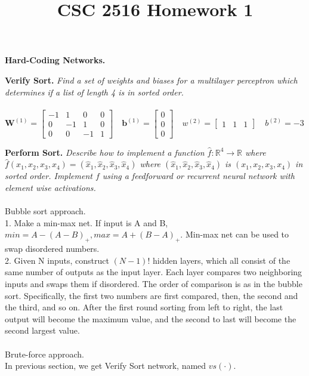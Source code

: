\documentclass{myhw}
\title{CSC 2516 Homework 1}
\begin{document}
\begin{homeworkProblem}
\textbf{Hard-Coding Networks.}
\begin{homeworkSection}
\textbf{Verify Sort.} 
\emph{Find a set of weights and biases for a multilayer perceptron which determines if a list of length 4 is in sorted order.} \\
\\
$\textbf{W}^{(1)} = \begin{bmatrix}
-1 & 1 & 0 & 0\\
0 & -1 & 1 & 0\\
0 & 0 & -1 & 1
\end{bmatrix} \quad 
\textbf{b}^{(1)} = \begin{bmatrix} 0 \\ 0 \\ 0 \end{bmatrix} \quad 
w^{(2)} = \begin{bmatrix} 1 & 1 & 1 \end{bmatrix} \quad b^{(2)} = -3$
\end{homeworkSection}
\begin{homeworkSection}
\textbf{Perform Sort.}
\emph{Describe how to implement a function $\hat{f} : \mathbb{R}^4 \rightarrow \mathbb{R}$ where $\hat{f} (x_1, x_2, x_3, x_4) = (\hat{x}_1, \hat{x}_2, \hat{x}_3, \hat{x}_4)$ where $(\hat{x}_1, \hat{x}_2, \hat{x}_3, \hat{x}_4)$ is $(x_1, x_2, x_3, x_4)$ in sorted order. Implement $f$ using a feedforward or recurrent neural network with element wise activations.} \\
\\
Bubble sort approach. \\
1. Make a min-max net. If input is A and B, $min = A - (A-B)_+, max = A + (B-A)_+$. Min-max net can be used to swap disordered numbers. \\
2. Given N inputs, construct $(N-1)!$ hidden layers, which all consist of the same number of outputs as the input layer. Each layer compares two neighboring inputs and swaps them if disordered. The order of comparison is as in the bubble sort. Specifically, the first two numbers are first compared, then, the second and the third, and so on. After the first round sorting from left to right, the last output will become the maximum value, and the second to last will become the second largest value. 
\\
\\
Brute-force approach. \\
In previous section, we get Verify Sort network, named $vs(\cdot)$. \\ 

\end{homeworkSection}
\end{homeworkProblem}
\end{document}
